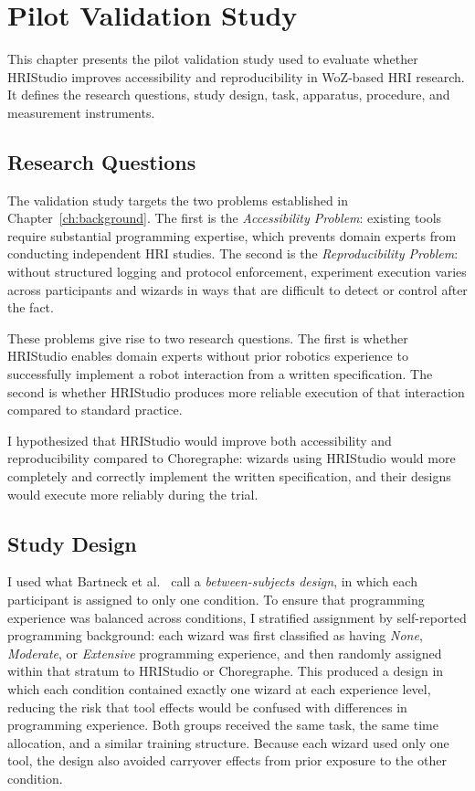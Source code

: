 \chapter{Pilot Validation Study}
\label{ch:evaluation}

This chapter presents the pilot validation study used to evaluate whether HRIStudio improves accessibility and reproducibility in WoZ-based HRI research. It defines the research questions, study design, task, apparatus, procedure, and measurement instruments.

\section{Research Questions}

The validation study targets the two problems established in Chapter~\ref{ch:background}. The first is the \emph{Accessibility Problem}: existing tools require substantial programming expertise, which prevents domain experts from conducting independent HRI studies. The second is the \emph{Reproducibility Problem}: without structured logging and protocol enforcement, experiment execution varies across participants and wizards in ways that are difficult to detect or control after the fact.

These problems give rise to two research questions. The first is whether HRIStudio enables domain experts without prior robotics experience to successfully implement a robot interaction from a written specification. The second is whether HRIStudio produces more reliable execution of that interaction compared to standard practice.

I hypothesized that HRIStudio would improve both accessibility and reproducibility compared to Choregraphe: wizards using HRIStudio would more completely and correctly implement the written specification, and their designs would execute more reliably during the trial.

\section{Study Design}

I used what Bartneck et al.~\cite{Bartneck2024} call a \emph{between-subjects design}, in which each participant is assigned to only one condition. To ensure that programming experience was balanced across conditions, I stratified assignment by self-reported programming background: each wizard was first classified as having \emph{None}, \emph{Moderate}, or \emph{Extensive} programming experience, and then randomly assigned within that stratum to HRIStudio or Choregraphe. This produced a design in which each condition contained exactly one wizard at each experience level, reducing the risk that tool effects would be confused with differences in programming experience. Both groups received the same task, the same time allocation, and a similar training structure. Because each wizard used only one tool, the design also avoided carryover effects from prior exposure to the other condition.

